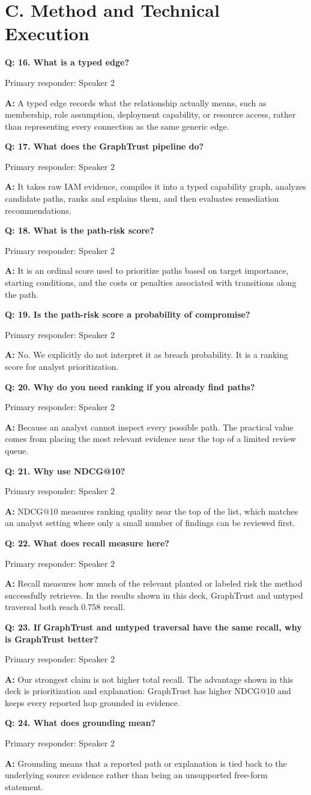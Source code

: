 \documentclass[11pt,a4paper]{article}
\newcommand{\q}[1]{\vspace{0.35em}\textbf{Q: #1}\par}
\newcommand{\a}[1]{\textbf{A:} #1\par}
\newcommand{\owner}[1]{\textcolor{Muted}{\small Primary responder: #1}\par}
\begin{document}
\section*{C. Method and Technical Execution}

\q{16. What is a typed edge?}
\owner{Speaker 2}
\a{A typed edge records what the relationship actually means, such as membership, role assumption, deployment capability, or resource access, rather than representing every connection as the same generic edge.}

\q{17. What does the GraphTrust pipeline do?}
\owner{Speaker 2}
\a{It takes raw IAM evidence, compiles it into a typed capability graph, analyzes candidate paths, ranks and explains them, and then evaluates remediation recommendations.}

\q{18. What is the path-risk score?}
\owner{Speaker 2}
\a{It is an ordinal score used to prioritize paths based on target importance, starting conditions, and the costs or penalties associated with transitions along the path.}

\q{19. Is the path-risk score a probability of compromise?}
\owner{Speaker 2}
\a{No. We explicitly do not interpret it as breach probability. It is a ranking score for analyst prioritization.}

\q{20. Why do you need ranking if you already find paths?}
\owner{Speaker 2}
\a{Because an analyst cannot inspect every possible path. The practical value comes from placing the most relevant evidence near the top of a limited review queue.}

\q{21. Why use NDCG@10?}
\owner{Speaker 2}
\a{NDCG@10 measures ranking quality near the top of the list, which matches an analyst setting where only a small number of findings can be reviewed first.}

\q{22. What does recall measure here?}
\owner{Speaker 2}
\a{Recall measures how much of the relevant planted or labeled risk the method successfully retrieves. In the results shown in this deck, GraphTrust and untyped traversal both reach 0.758 recall.}

\q{23. If GraphTrust and untyped traversal have the same recall, why is GraphTrust better?}
\owner{Speaker 2}
\a{Our strongest claim is not higher total recall. The advantage shown in this deck is prioritization and explanation: GraphTrust has higher NDCG@10 and keeps every reported hop grounded in evidence.}

\q{24. What does grounding mean?}
\owner{Speaker 2}
\a{Grounding means that a reported path or explanation is tied back to the underlying source evidence rather than being an unsupported free-form statement.}
\end{document}
